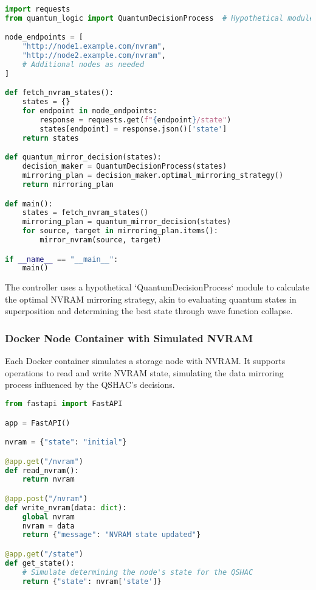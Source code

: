 \documentclass[12pt]{article}
\begin{document}
\begin{lstlisting}[language=Python, caption=Quantum Superposition HA Controller]
import requests
from quantum_logic import QuantumDecisionProcess  # Hypothetical module

node_endpoints = [
    "http://node1.example.com/nvram",
    "http://node2.example.com/nvram",
    # Additional nodes as needed
]

def fetch_nvram_states():
    states = {}
    for endpoint in node_endpoints:
        response = requests.get(f"{endpoint}/state")
        states[endpoint] = response.json()['state']
    return states

def quantum_mirror_decision(states):
    decision_maker = QuantumDecisionProcess(states)
    mirroring_plan = decision_maker.optimal_mirroring_strategy()
    return mirroring_plan

def main():
    states = fetch_nvram_states()
    mirroring_plan = quantum_mirror_decision(states)
    for source, target in mirroring_plan.items():
        mirror_nvram(source, target)

if __name__ == "__main__":
    main()
\end{lstlisting}

The controller uses a hypothetical `QuantumDecisionProcess` module to calculate the optimal NVRAM mirroring strategy, akin to evaluating quantum states in superposition and determining the best state through wave function collapse.

\subsubsection{Docker Node Container with Simulated NVRAM}

Each Docker container simulates a storage node with NVRAM. It supports operations to read and write NVRAM state, simulating the data mirroring process influenced by the QSHAC's decisions.

\begin{lstlisting}[language=Python, caption=Docker Node Container with Simulated NVRAM]
from fastapi import FastAPI

app = FastAPI()

nvram = {"state": "initial"}

@app.get("/nvram")
def read_nvram():
    return nvram

@app.post("/nvram")
def write_nvram(data: dict):
    global nvram
    nvram = data
    return {"message": "NVRAM state updated"}

@app.get("/state")
def get_state():
    # Simulate determining the node's state for the QSHAC
    return {"state": nvram['state']}
\end{lstlisting}
\end{document}
